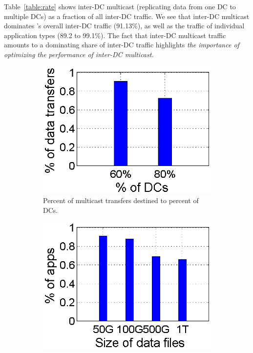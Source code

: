 Table~\ref{table:rate} shows inter-DC multicast (replicating data 
from one DC to multiple DCs) as a fraction of all inter-DC traffic.
We see that inter-DC multicast dominates \company's overall inter-DC
traffic (91.13\%), as well as the traffic of individual application 
types (89.2 to 99.1\%). The fact that inter-DC multicast traffic
amounts to a dominating share of inter-DC traffic highlights {\em the
importance of optimizing the performance of inter-DC multicast.}

\begin{figure}[t]
        \centering
        \begin{subfigure}[b]{0.23\textwidth}
                \centering
                \includegraphics[width=\textwidth]{images/destinationDC.eps}%
                \caption{Percent of multicast transfers destined to percent of DCs.}
                \label{fig:bulk:dest}
        \end{subfigure}
	\hspace{0.1cm}
        \begin{subfigure}[b]{0.23\textwidth}
                \centering
                \includegraphics[width=\textwidth]{images/DataSize.eps}

\end{subfigure}
\end{figure}
